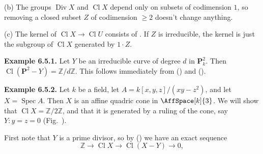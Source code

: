 {(b) The groups $\operatorname{Div} X$ and $\operatorname{Cl} X$ depend only on subsets of codimension $1$, so removing a closed subset $Z$ of codimension $\ge2$ doesn't change anything.

(c) The kernel of $\operatorname{Cl} X\to\operatorname{Cl} U$ consists of . If $Z$ is irreducible, the kernel is just the subgroup of $\operatorname{Cl} X$ generated by $1\cdot Z$.

\medskip
\noindent\hypertarget{result-II-6.5.1}{}\textbf{Example 6.5.1.} Let $Y$ be an irreducible curve of degree $d$ in $\mathbf P_k^2$. Then $\operatorname{Cl}(\mathbf P^2-Y)=\mathbb Z/d\mathbb Z$. This follows immediately from () and ().

\medskip
\noindent\hypertarget{result-II-6.5.2}{}\textbf{Example 6.5.2.} Let $k$ be a field, let $A=k[x,y,z]/(xy-z^2)$, and let $X=\operatorname{Spec} A$. Then $X$ is an affine quadric cone in $\AffSpace[k]{3}$. We will show that $\operatorname{Cl} X=\mathbb Z/2\mathbb Z$, and that it is generated by a ruling of the cone, say $Y\colon y=z=0$ (Fig.~).

First note that $Y$ is a prime divisor, so by () we have an exact sequence
\[
\mathbb Z\to \operatorname{Cl} X\to\operatorname{Cl}(X-Y)\to0,
\]}
